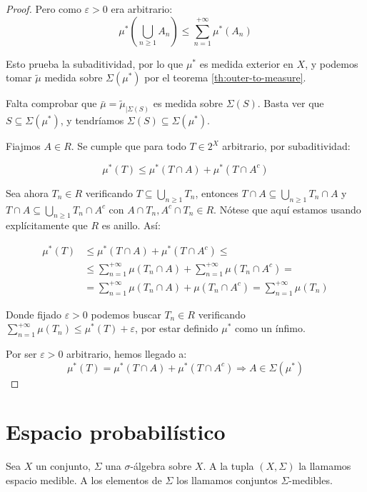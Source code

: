 \begin{proof}
 Pero como $\varepsilon > 0$ era arbitrario: 
 \[\mu^\ast \left(\bigcup_{n\ge 1} A_n \right) \le \sum_{n=1}^{+\infty}\mu^\ast(A_n)\]
 
 Esto prueba la subaditividad, por lo que $\mu^\ast$ es medida exterior en $X$, y podemos tomar $\widetilde{\mu}$ medida 
 sobre $\Sigma(\mu^\ast)$ por el teorema \ref{th:outer-to-measure}.
 
 Falta comprobar que $\bar{\mu} = \widetilde{\mu}_{|\Sigma(S)}$ es medida sobre $\Sigma(S)$. Basta ver que 
 $S\subseteq \Sigma(\mu^\ast)$, y tendríamos $\Sigma(S) \subseteq \Sigma(\mu^\ast)$.
 
 Fiajmos $A\in R$. Se cumple que para todo $T\in 2^X$ arbitrario, por subaditividad:

 \[\mu^\ast(T) \le \mu^\ast(T\cap A) + \mu^\ast(T\cap A^c)\]
 
 Sea ahora $T_n \in R$ verificando $T\subseteq \bigcup_{n\ge 1} T_n$, entonces 
 $T\cap A \subseteq \bigcup_{n\ge 1} T_n \cap A$ y $T\cap A \subseteq \bigcup_{n\ge 1} T_n \cap A^c$ con 
 $A\cap T_n, A^c \cap T_n \in R$. Nótese que aquí estamos usando explícitamente que $R$ es anillo. Así:
 
 \begin{align*}
 \mu^\ast(T) &\le \mu^\ast(T\cap A) + \mu^\ast(T\cap A^c) \le \\ 
             &\le \sum_{n=1}^{+\infty}\mu(T_n \cap A) + \sum_{n=1}^{+\infty} \mu(T_n \cap A^c) = \\
             &= \sum_{n=1}^{+\infty}\mu(T_n \cap A) + \mu(T_n \cap A^c) = \sum_{n=1}^{+\infty} \mu(T_n)  
 \end{align*}
 
 Donde fijado $\varepsilon > 0$ podemos buscar $T_n \in R$ verificando $\sum_{n=1}^{+\infty} \mu(T_n) \le \mu^\ast(T) + \varepsilon$, 
 por estar definido $\mu^\ast$ como un ínfimo.
 
 Por ser $\varepsilon > 0$ arbitrario, hemos llegado a: 
 \[\mu^\ast(T) = \mu^\ast(T\cap A) + \mu^\ast(T\cap A^c) \Rightarrow A\in \Sigma(\mu^\ast)\]
\end{proof}



\section{Espacio probabilístico}
\label{sec:prob-space}
\begin{definition}
 Sea $X$ un conjunto, $\Sigma$ una $\sigma$-álgebra sobre $X$. A la tupla $(X,\Sigma)$ la llamamos
 espacio medible. A los elementos de $\Sigma$ los llamamos conjuntos $\Sigma$-medibles.
\end{definition}


